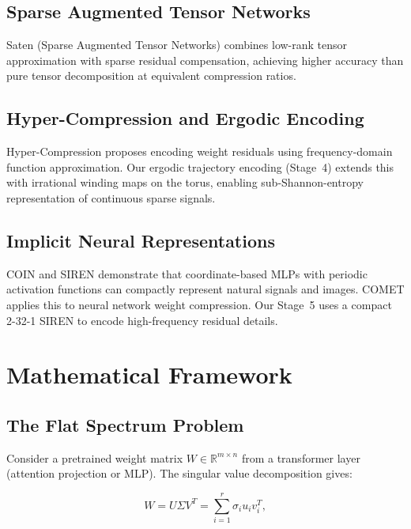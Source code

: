 \documentclass[11pt,a4paper]{article}
\begin{document}
\subsection{Sparse Augmented Tensor Networks}

Saten (Sparse Augmented Tensor Networks) \cite{saten2024} combines low-rank tensor
approximation with sparse residual compensation, achieving higher accuracy than
pure tensor decomposition at equivalent compression ratios.

\subsection{Hyper-Compression and Ergodic Encoding}

Hyper-Compression \cite{taori2024hypercompression} proposes encoding weight residuals
using frequency-domain function approximation. Our ergodic trajectory encoding
(Stage~4) extends this with irrational winding maps on the torus, enabling
sub-Shannon-entropy representation of continuous sparse signals.

\subsection{Implicit Neural Representations}

COIN \cite{dupont2022coin} and SIREN \cite{sitzmann2020siren} demonstrate that
coordinate-based MLPs with periodic activation functions can compactly represent
natural signals and images. COMET \cite{luo2024comet} applies this to neural
network weight compression. Our Stage~5 uses a compact 2-32-1 SIREN to encode
high-frequency residual details.

\section{Mathematical Framework}

\subsection{The Flat Spectrum Problem}

Consider a pretrained weight matrix $W \in \mathbb{R}^{m \times n}$ from a transformer
layer (attention projection or MLP). The singular value decomposition gives:

\[
	W = U \Sigma V^T = \sum_{i=1}^r \sigma_i u_i v_i^T,
\]
\end{document}
